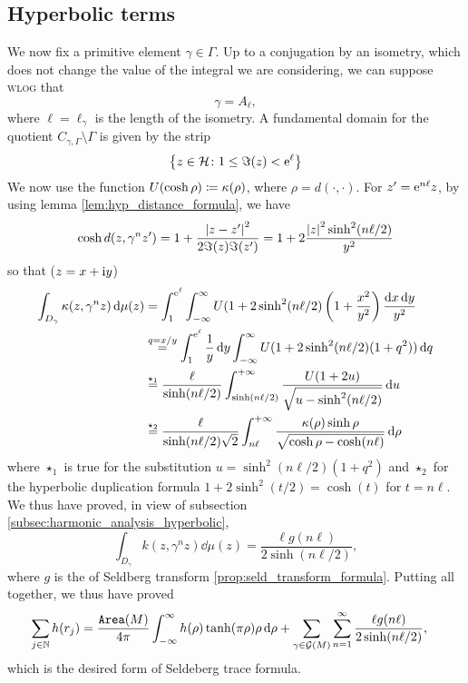 \subsection{Hyperbolic terms}

We now fix a primitive element $\gamma\in\Gamma$. Up to a conjugation by an isometry, which does not change the value of the integral we are considering, we can suppose \textsc{wlog} that 
\[
\gamma= A_{\ell},
\]
where $\ell=\ell_{\gamma}$ is the length of the isometry. A fundamental domain for the quotient $C_{\gamma,\Gamma}\setminus\Gamma$ is given by the strip 
\[
\left\{
z\in\mathcal{H}\colon 1\leq \Im(z)<\mathrm{e}^{\ell}
\right\}
\]
We now use the function $U(\cosh \rho)\coloneqq\kappa(\rho)$, where $\rho=d(\cdot,\cdot)$. For $z'=\mathrm{e}^{n\ell} z$, by using lemma \ref{lem:hyp_distance_formula}, we have
\[
\cosh d(z,\gamma^{n}z')=1+\frac{\left| z-z'\right|^{2}}{2\Im(z)\Im(z')}=1+2\frac{\left| z\right|^{2}\sinh^{2}(n\ell/2)}{y^{2}}
\]
so that ($z=x+\mathrm{i} y$)
\begin{align*}
\int_{D_{\gamma}}\kappa(z,\gamma^{n}z)\mathop{}\!\mathrm{d}\mu(z)&=\int_{1}^{\mathrm{e}^{\ell}}\int_{-\infty}^{\infty}U(1+2\sinh^{2}(n\ell/2)\left(1+\frac{x^{2}}{y^{2}}\right)\frac{\mathop{}\!\mathrm{d} x\mathop{}\!\mathrm{d} y}{y^{2}}\\
&\stackrel{q=x/y}{=}\int_{1}^{\mathrm{e}^{\ell}}\frac{1}{y}\mathop{}\!\mathrm{d} y\int_{-\infty}^{\infty}U(1+2\sinh^{2}(n\ell/2)(1+q^{2}))\mathop{}\!\mathrm{d} q\\
&\stackrel{\star_{1}}{=}\frac{\ell}{\sinh(n\ell/2)}\int_{\sinh(n\ell/2)}^{+\infty}\frac{U(1+2u)}{\sqrt{u-\sinh^{2}(n\ell/2)}}\mathop{}\!\mathrm{d} u\\
&\stackrel{\star_{2}}{=}\frac{\ell}{\sinh(n\ell/2)\sqrt{2}}\int_{n\ell}^{+\infty}\frac{\kappa(\rho)\sinh\rho}{\sqrt{\cosh\rho-\cosh(n\ell)}}\mathop{}\!\mathrm{d} \rho
\end{align*}
where $\star_{1}$ is true for the substitution $u=\sinh^{2}(n\ell/2)(1+q^{2})$ and $\star_{2}$ for the hyperbolic duplication formula $1+2\sinh^{2}(t/2)=\cosh(t)$ for $t=n\ell$. We thus have proved, in view of subsection \ref{subsec:harmonic_analysis_hyperbolic},
\[
\int_{D_{\gamma}}k(z,\gamma^{n}z)\dd\mu(z)=\frac{\ell g(n\ell)}{2\sinh(n\ell/2)},
\]
where $g$ is the  of Seldberg transform \ref{prop:seld_transform_formula}. Putting all together, we thus have proved
\begin{align*}
\sum_{j\in\mathbb{N}}h(r_{j})&=\frac{\operatorname{\mathtt{Area}}(M)}{4\pi}\int_{-\infty}^{\infty}h(\rho)\tanh(\pi\rho)\rho\mathop{}\!\mathrm{d}\rho+\sum_{\gamma\in\mathcal{G}\left(M\right)}\sum_{n=1}^{\infty}\frac{\ell g(n\ell)}{2\sinh(n\ell/2)},
\end{align*}
which is the desired form of Seldeberg trace formula.


